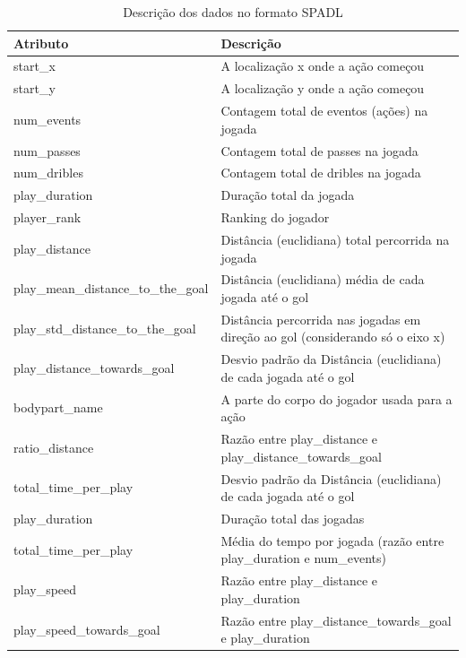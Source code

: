 \documentclass{article}
\begin{document}
\begin{table}[H]
	\centering
	\label{tab:atributosSD}
	\begin{tabular}{|l|l|}
		\hline
		\textbf{Atributo} & \textbf{Descrição}
		\\
		\hline
		start\_x          & A localização x onde a ação começou 
		\\
		\hline
		start\_y          & A localização y onde a ação começou
		\\
		\hline
		num\_events       & Contagem total de eventos (ações) na jogada
		\\
		\hline
		num\_passes        & Contagem total de passes na jogada 
		\\
		\hline
		num\_dribles       & Contagem total de dribles na jogada 
		\\
		\hline
		play\_duration      & Duração total da jogada 
		\\
		\hline
		player\_rank        & Ranking do jogador 
		\\
		\hline
		play\_distance      & Distância (euclidiana) total percorrida na 
		jogada
		\\
		\hline
		play\_mean\_distance\_to\_the\_goal  & Distância (euclidiana) 
		média de cada jogada até o gol
		\\
		\hline
		play\_std\_distance\_to\_the\_goal  & Distância percorrida 
		nas jogadas em direção ao gol (considerando só o eixo x)
		\\
		\hline
		play\_distance\_towards\_goal  & Desvio padrão da 
		Distância (euclidiana) de cada jogada até o gol 
		\\
		\hline
		bodypart\_name     & A parte do corpo do jogador usada para a
		ação
		\\
		\hline
		ratio\_distance  & Razão entre play\_distance e 
		play\_distance\_towards\_goal
		\\
		\hline
		total\_time\_per\_play  & Desvio padrão da 
		Distância (euclidiana) de cada jogada até o gol 
		\\
		\hline
		play\_duration  & Duração total das jogadas
		\\
		\hline
		total\_time\_per\_play  & Média do tempo por jogada 
		(razão entre play\_duration e num\_events) 
		\\
		\hline
		play\_speed  & Razão entre play\_distance e play\_duration
		\\
		\hline
		play\_speed\_towards\_goal  & Razão entre 
		play\_distance\_towards\_goal e play\_duration
		\\
		\hline
	\end{tabular}
	\caption{Descrição dos dados no formato SPADL}
\end{table}
\end{document}
